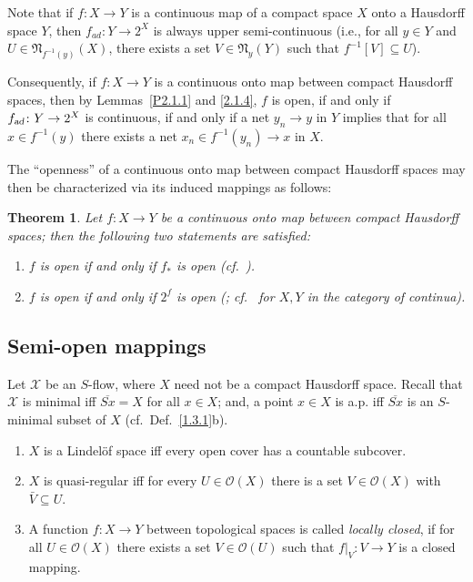 \documentclass[12pt,final,3p,times]{elsarticle}
\newtheorem{sthm}{Theorem}[subsection]
\theoremstyle{definition}
\numberwithin{equation}{section}
\begin{document}
Note that if $f\colon X\rightarrow Y$ is a continuous map of a compact space $X$ onto a Hausdorff space $Y$, then $f_{ad}\colon Y\rightarrow 2^X$ is always upper semi-continuous (i.e., for all $y\in Y$ and $U\in\mathfrak{N}_{f^{-1}(y)}(X)$, there exists a set $V\in\mathfrak{N}_y(Y)$ such that $f^{-1}[V]\subseteq U$).

Consequently, if $f\colon X\rightarrow Y$ is a continuous onto map between compact Hausdorff spaces, then by Lemmas~\ref{P2.1.1} and \ref{2.1.4}, $f$ is open, if and only if $f_\textsl{ad}\colon Y\rightarrow2^X$ is continuous, if and only if a net $y_n\to y$ in $Y$ implies that for all $x\in f^{-1}(y)$ there exists a net $x_n\in f^{-1}(y_n)\to x$ in $X$.

The ``openness'' of a continuous onto map between compact Hausdorff spaces may then be characterized via its induced mappings as follows:

\begin{sthm}\label{2.1.5}
Let $f\colon X\rightarrow Y$ be a continuous onto map between compact Hausdorff spaces; then the following two statements are satisfied:
\begin{enumerate}[(1)]
\item $f$ is open if and only if $f_*$ is open (cf.~\cite[Prop.~4.1 $\&$ Thm.~4.4]{DE}).
\item $f$ is open if and only if $2^f$ is open (\cite[Thm.~3]{DX}; cf.~\cite[Thm.~4.3]{H97} for $X, Y$ in the category of continua).
\end{enumerate}
\end{sthm}

\subsection{Semi-open mappings}\label{sP.2}

Let $\mathscr{X}$ be an $S$-flow, where $X$ need not be a compact Hausdorff space. Recall that $\mathscr{X}$ is minimal iff $\overline{Sx}=X$ for all $x\in X$; and, a point $x\in X$ is a.p. iff $\overline{Sx}$ is an $S$-minimal subset of $X$ (cf.~Def.~\ref{1.3.1}b). 

\begin{enumerate}[\ref{sP.2}a]
\item $X$ is a Lindel\"{o}f space \cite{K55, E89} iff every open cover has a countable subcover. 

\item $X$ is quasi-regular \cite{O60, M75} iff for every $U\in\mathscr{O}(X)$ there is a set $V\in\mathscr{O}(X)$ with $\bar{V}\subseteq U$. 

\item A function $f\colon X\rightarrow Y$ between topological spaces is called \textit{locally closed}, if for all $U\in\mathscr{O}(X)$ there exists a set $V\in\mathscr{O}(U)$ such that $f|_V\colon V\rightarrow Y$ is a closed mapping.
\end{enumerate}
\end{document}
